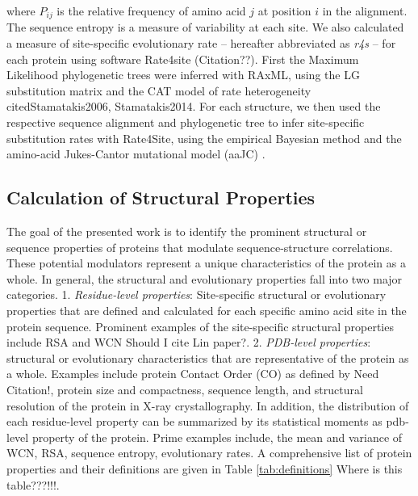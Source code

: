 \documentclass[12pt]{article}
\begin{document}
    where $P_{ij}$ is the relative frequency of amino acid $j$ at position $i$ in the alignment. The sequence entropy is a measure of variability at each site. We also calculated a measure of site-specific evolutionary rate -- hereafter abbreviated as {\it r4s} -- for each protein using software Rate4site {\color{red}(Citation??)}. First the Maximum Likelihood phylogenetic trees were inferred with RAxML, using the LG substitution matrix and the CAT model of rate heterogeneity cited{Stamatakis2006, Stamatakis2014}. For each structure, we then used the respective sequence alignment and phylogenetic tree to infer site-specific substitution rates with Rate4Site, using the empirical Bayesian method and the amino-acid Jukes-Cantor mutational model (aaJC) \citep{Mayroseetal2004}.

    \subsection*{Calculation of Structural Properties}
    The goal of the presented work is to identify the prominent structural or sequence properties of proteins that modulate sequence-structure correlations. These potential modulators represent a unique characteristics of the protein as a whole.  In general, the structural and evolutionary properties fall into two major categories.  1. {\it Residue-level properties}: Site-specific structural or evolutionary properties that are defined and calculated for each specific amino acid site in the protein sequence. Prominent examples of the site-specific structural properties include RSA \cite{Fransozaetal2009, Scherreretal2012, Yehetal2014}  and WCN \citep{Shihetal2012, Yehetal2014} {\color{red}Should I cite Lin paper?}.   2. {\it PDB-level properties}: structural or evolutionary characteristics that are representative of the protein as a whole. Examples include protein Contact Order (CO) as defined by {\color{red}Need Citation!}, protein size and compactness, sequence length, and structural resolution of the protein in X-ray crystallography.  In addition, the distribution of each residue-level property can be summarized by its statistical moments as pdb-level property of the protein. Prime examples include, the mean and variance of WCN, RSA, sequence entropy, evolutionary rates. A comprehensive list of protein properties and their definitions are given in Table 
 \ref{tab:definitions} {\color{red} Where is this table???!!!}. \\
\end{document}
